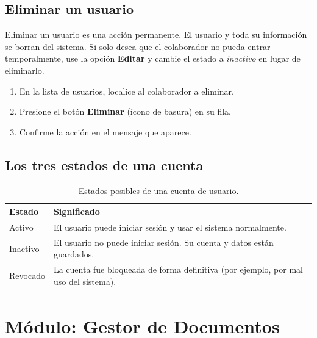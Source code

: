 \documentclass[10pt,letterpaper]{report}
\begin{document}
\subsection{Eliminar un usuario}

\begin{alertabox}
Eliminar un usuario es una acción permanente. El usuario y toda su información se borran del sistema. Si solo desea que el colaborador no pueda entrar temporalmente, use la opción \textbf{Editar} y cambie el estado a \textit{inactivo} en lugar de eliminarlo.
\end{alertabox}

\begin{enumerate}[label=\arabic*.]
  \item En la lista de usuarios, localice al colaborador a eliminar.
  \item Presione el botón \textbf{Eliminar} (ícono de basura) en su fila.
  \item Confirme la acción en el mensaje que aparece.
\end{enumerate}

\subsection{Los tres estados de una cuenta}

\begin{table}[H]
\centering
\caption{Estados posibles de una cuenta de usuario.}
\label{tab:estados}
\begin{tabular}{p{} p{}}
\toprule
\textbf{Estado} & \textbf{Significado} \\
\midrule
Activo & El usuario puede iniciar sesión y usar el sistema normalmente. \\
Inactivo & El usuario no puede iniciar sesión. Su cuenta y datos están guardados. \\
Revocado & La cuenta fue bloqueada de forma definitiva (por ejemplo, por mal uso del sistema). \\
\bottomrule
\end{tabular}
\end{table}

\section{Módulo: Gestor de Documentos}
\label{sec:gestor}
\end{document}
